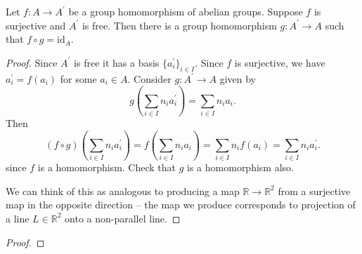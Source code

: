 \begin{lemma}
Let $f : A \to A^\prime$ be a group homomorphism of abelian
groups. Suppose $f$ is surjective and $A^\prime$ is free. Then there
is a group homomorphism $g : A^\prime \to A$ such that
$f \circ g = \mathrm{id}_A$.
\end{lemma}
\begin{proof}
Since $A^\prime$ is free it has a basis $\{ a_i^\prime \}_{i \in
  I}$. Since $f$ is surjective, we have $a_i^\prime = f(a_i)$ for some
$a_i \in A$. Consider $g : A^\prime \to A$ given by
$$
g\left(\sum_{i \in I} n_i a_i^\prime\right) = \sum_{i \in I} n_i a_i.
$$
Then
$$
(f \circ g)\left(\sum_{i \in I} n_i a_i^\prime\right)
= f\left(\sum_{i \in I} n_i a_i\right)
= \sum_{i \in I} n_i f(a_i)
= \sum_{i \in I} n_i a_i^\prime.
$$
since $f$ is a homomorphism. Check that $g$ is a homomorphism also.

We can think of this as analogous to producing a map
$\mathbb{R} \to \mathbb{R}^2$ from a surjective map in the opposite
direction -- the map we produce corresponds to projection of a line
$L \in \mathbb{R}^2$ onto a non-parallel line.
\end{proof}

\begin{proof}
\end{proof}
